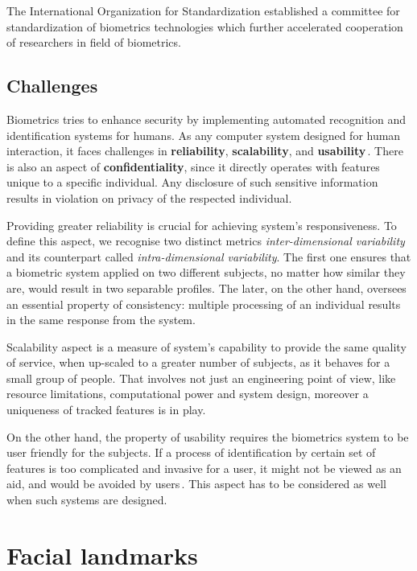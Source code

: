 The International Organization for Standardization established a committee for standardization of biometrics technologies which further accelerated cooperation of researchers in field of biometrics.

\subsection{Challenges}

Biometrics tries to enhance security by implementing automated recognition and identification systems for humans. As any computer system designed for human interaction, it faces challenges in \textbf{reliability}, \textbf{scalability}, and \textbf{usability}\,\cite{nodal_points}. There is also an aspect of \textbf{confidentiality}, since it directly operates with features unique to a specific individual. Any disclosure of such sensitive information results in violation on privacy of the respected individual.

Providing greater reliability is crucial for achieving system's responsiveness. To define this aspect, we recognise two distinct metrics \textit{inter-dimensional variability} and its counterpart called \textit{intra-dimensional variability}. The first one ensures that a biometric system applied on two different subjects, no matter how similar they are, would result in two separable profiles. The later, on the other hand, oversees an essential property of consistency: multiple processing of an individual results in the same response from the system.

Scalability aspect is a measure of system's capability to provide the same quality of service, when up-scaled to a greater number of subjects, as it behaves for a small group of people. That involves not just an engineering point of view, like resource limitations, computational power and system design, moreover a uniqueness of tracked features is in play.

On the other hand, the property of usability requires the biometrics system to be user friendly for the subjects. If a process of identification by certain set of features is too complicated and invasive for a user, it might not be viewed as an aid, and would be avoided by users\,\cite{nieto2002public}. This aspect has to be considered as well when such systems are designed.

\section{Facial landmarks}

